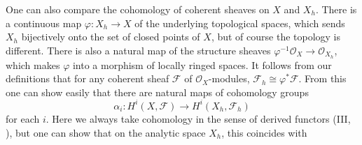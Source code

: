 {One can also compare the cohomology of coherent sheaves on $X$ and $X_h$. There is a continuous map $\varphi\colon X_h\to X$ of the underlying topological spaces, which sends $X_h$ bijectively onto the set of closed points of $X$, but of course the topology is different. There is also a natural map of the structure sheaves $\varphi^{-1}\mathcal O_X\to\mathcal O_{X_h}$, which makes $\varphi$ into a morphism of locally ringed spaces. It follows from our definitions that for any coherent sheaf $\mathcal F$ of $\mathcal O_X$-modules, $\mathcal F_h\cong\varphi^*\mathcal F$. From this one can show easily that there are natural maps of cohomology groups
\[
\alpha_i\colon H^i(X,\mathcal F)\to H^i(X_h,\mathcal F_h)
\]
for each $i$. Here we always take cohomology in the sense of derived functors (III, ), but one can show that on the analytic space $X_h$, this coincides with
}
